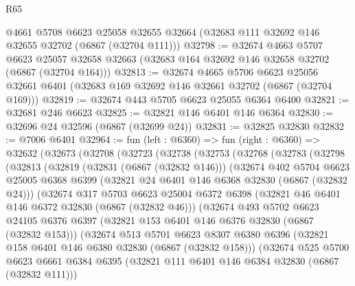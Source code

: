 \begin{lexlean}{R65}
\begin{coremodule}
{    @4661
    @5708
    @6623
    @25058
    @32655
    @32664
    (@32683 @111 @32692 @146 @32655 @32702 (@6867 (@32704 @111)))
@32798 := @32674
    @4663
    @5707
    @6623
    @25057
    @32658
    @32663
    (@32683 @164 @32692 @146 @32658 @32702 (@6867 (@32704 @164)))
@32813 := @32674
    @4665
    @5706
    @6623
    @25056
    @32661
    @6401
    (@32683 @169 @32692 @146 @32661 @32702 (@6867 (@32704 @169)))
@32819 := @32674 @443 @5705 @6623 @25055 @6364 @6400
@32821 := @32681 @246 @6623
@32825 := @32821 @146 @6401 @146 @6364
@32830 := @32696 @24 @32596 (@6867 (@32699 @24))
@32831 := @32825 @32830
@32832 := @7006 @6401
@32964 := fun (left : @6360) =>
  fun (right : @6360) =>
  @32632
    (@32673
      (@32708
        (@32723
          (@32738
            (@32753
              (@32768
                (@32783
                  (@32798
                    (@32813
                      (@32819
                        (@32831 (@6867 (@32832 @146)))
                        (@32674
                          @402
                          @5704
                          @6623
                          @25005
                          @6368
                          @6399
                          (@32821 @24 @6401 @146 @6368 @32830 (@6867 (@32832 @24)))
                          (@32674
                            @317
                            @5703
                            @6623
                            @25004
                            @6372
                            @6398
                            (@32821 @46 @6401 @146 @6372 @32830 (@6867 (@32832 @46)))
                            (@32674
                              @493
                              @5702
                              @6623
                              @24105
                              @6376
                              @6397
                              (@32821 @153 @6401 @146 @6376 @32830 (@6867 (@32832 @153)))
                              (@32674
                                @513
                                @5701
                                @6623
                                @8307
                                @6380
                                @6396
                                (@32821 @158 @6401 @146 @6380 @32830 (@6867 (@32832 @158)))
                                (@32674
                                  @525
                                  @5700
                                  @6623
                                  @6661
                                  @6384
                                  @6395
                                  (@32821 @111 @6401 @146 @6384 @32830 (@6867 (@32832 @111)))
}
\end{coremodule}
\end{lexlean}
